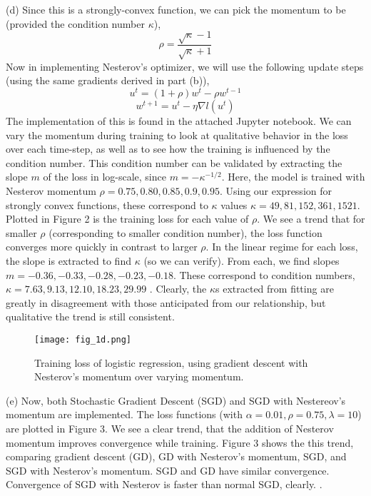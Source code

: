 \documentclass[12pt]{article}
\begin{document}
(d) Since this is a strongly-convex function, we can pick the momentum to be (provided the condition number $\kappa$), 
$$ \rho = \frac{ \sqrt{\kappa} - 1 }{ \sqrt{\kappa} + 1  } $$
Now in implementing Nesterov's optimizer, we will use the following update steps (using the same gradients derived in part (b)), 
$$u^{t} = (1+\rho)w^{t} - \rho w^{t-1}  $$
$$w^{t+1} = u^{t}  - \eta \nabla l(u^{t})   $$
The implementation of this is found in the attached Jupyter notebook. We can vary the momentum during training to look at qualitative behavior in the loss over each time-step, as well as to see how the training is influenced by the condition number. This condition number can be validated by extracting the slope $m$ of the loss in log-scale, since $ m =  - \kappa^{-1/2}  $. Here, the model is trained with Nesterov momentum $\rho =0.75, 0.80, 0.85, 0.9, 0.95$.  Using our expression for strongly convex functions, these correspond to $\kappa$ values $\kappa = 49, 81, 152, 361,1521$. Plotted in Figure 2 is the training loss for each value of $\rho$. We see a trend that for smaller $\rho$ (corresponding to smaller condition number), the loss function converges more quickly in contrast to larger $\rho$. In the linear regime for each loss, the  slope is extracted to find $\kappa$ (so we can verify). From each, we find slopes $m = -0.36, -0.33, -0.28, -0.23, -0.18$.  These correspond to condition numbers, $\kappa =  7.63, 9.13,  12.10, 18.23, 29.99 $ . Clearly, the $\kappa$s extracted from fitting are greatly in disagreement with those anticipated from our relationship, but qualitative the trend is still consistent.     \newline  \newline  

\begin{figure}[h!]
\texttt{[image: fig\_1d.png]}
\caption{Training loss of logistic regression, using gradient descent with Nesterov's momentum over varying momentum.} 
\centering
\end{figure}
 
(e) Now, both Stochastic Gradient Descent (SGD)  and SGD with Nestereov's momentum are implemented. The loss functions (with $\alpha = 0.01, \rho = 0.75, \lambda =  10$) are plotted in Figure 3. We see a clear trend, that the addition of Nesterov momentum improves convergence while training. Figure 3 shows the this trend, comparing gradient descent (GD), GD with Nesterov's momentum, SGD, and SGD with Nesterov's momentum.   SGD and GD  have similar convergence. Convergence of SGD with Nesterov is faster than normal SGD, clearly. \newline \newline.     
\end{document}
